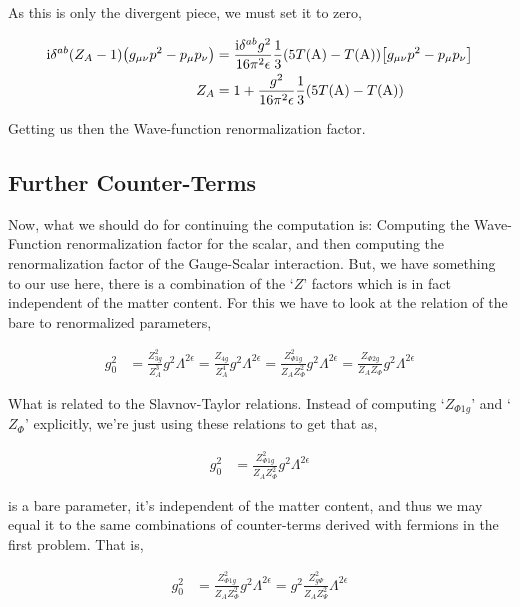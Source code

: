 As this is only the divergent piece, we must set it to zero,

\begin{align}
    \textnormal{i}\delta^{ab}\qty(Z_A-1)\qty(g_{\mu\nu}p^2-p_\mu p_\nu)&=\frac{\textnormal{i}\delta^{ab}g^2}{16\pi^2\epsilon}\frac13\qty(5T\qty(\textnormal{A})-T\qty(\textnormal{A}))\qty[g_{\mu\nu}p^2-p_\mu p_\nu]\nonumber\\
    Z_A&=1+\frac{g^2}{16\pi^2\epsilon}\frac13\qty(5T\qty(\textnormal{A})-T\qty(\textnormal{A}))\nonumber
\end{align}

Getting us then the Wave-function renormalization factor.

\subsection{Further Counter-Terms}

Now, what we should do for continuing the computation is: Computing 
the Wave-Function renormalization factor for the scalar, and then 
computing the renormalization factor of the Gauge-Scalar interaction. But, 
we have something to our use here, there is a combination of the `$Z$' 
factors which is in fact independent of the matter content. For this we 
have to look at the relation of the bare to renormalized parameters,

\begin{align}
    g_0^2&=\frac{Z_{3g}^2}{Z_A^3}g^2\Lambda^{2\epsilon}
    =\frac{Z_{4g}}{Z_A^4}g^2\Lambda^{2\epsilon}
    =\frac{Z_{\Phi1g}^2}{Z_AZ_{\Phi}^2}g^2\Lambda^{2\epsilon}
    =\frac{Z_{\Phi2g}}{Z_AZ_{\Phi}}g^2\Lambda^{2\epsilon}\nonumber
\end{align}

What is related to the Slavnov-Taylor relations. Instead of computing 
`$Z_{\Phi1g}$' and `$Z_{\Phi}$' explicitly, we're just using these relations 
to get that as,

\begin{align}
    g_0^2&=\frac{Z_{\Phi1g}^2}{Z_AZ_\Phi^2}g^2\Lambda^{2\epsilon}\nonumber
\end{align}

is a bare parameter, it's independent of the matter content, and thus we may 
equal it to the same combinations of counter-terms derived with fermions in 
the first problem. That is,

\begin{align}
    g_0^2&=\frac{Z_{\Phi1g}^2}{Z_AZ_\Phi^2}g^2\Lambda^{2\epsilon}=g^2\frac{Z_{g\Psi}^2}{Z_AZ_\Psi^2}\Lambda^{2\epsilon}\nonumber
\end{align}

